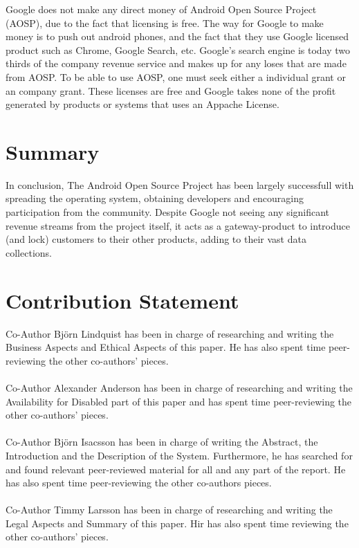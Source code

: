 \documentclass[conference]{IEEEtran}
\begin{document}
Google does not make any direct money of Android Open Source Project (AOSP), due to the fact that licensing is free.\cite{Money} The way for Google to make money is to push out android phones, and the fact that they use Google licensed product such as Chrome, Google Search, etc. Google's search engine is today two thirds of the company revenue service and makes up for any loses that are made from AOSP. To be able to use AOSP, one must seek either a individual grant or an company grant. \cite{android-licenses} These licenses are free and Google takes none of the profit generated by products or systems that uses an Appache License.


\section{Summary}

In conclusion, The Android Open Source Project has been largely successfull with spreading the operating system, obtaining developers and encouraging participation from the community. Despite Google not seeing any significant revenue streams from the project itself, it acts as a gateway-product to introduce (and lock) customers to their other products, adding to their vast data collections.


\section{Contribution Statement}

Co-Author Björn Lindquist has been in charge of researching and writing the Business Aspects and Ethical Aspects of this paper. He has also spent time peer-reviewing the other co-authors' pieces.
\\
\\
Co-Author Alexander Anderson has been in charge of researching and writing the Availability for Disabled part of this paper and has spent time peer-reviewing the other co-authors' pieces.
\\
\\
Co-Author Björn Isacsson has been in charge of writing the Abstract, the Introduction and the Description of the System. Furthermore, he has searched for and found relevant peer-reviewed material for all and any part of the report. He has also spent time peer-reviewing the other co-authors pieces. 
\\
\\
Co-Author Timmy Larsson has been in charge of researching and writing the Legal Aspects and Summary of this paper. Hir has also spent time reviewing the other co-authors' pieces.
\end{document}
